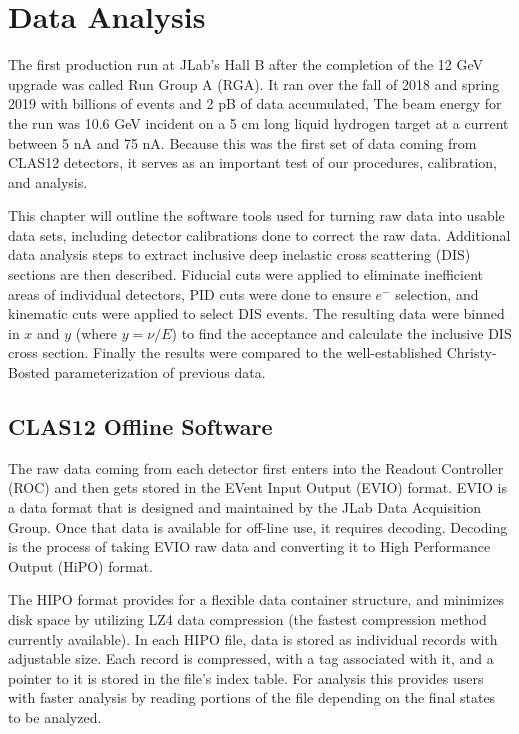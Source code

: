 \chapter{Data Analysis}
\label{ch:analysis}
The first production run at JLab's Hall B after the completion of the 12 GeV upgrade was called Run Group A (RGA). It ran over the fall of 2018 and spring 2019 with billions of events and 2 pB of data accumulated,\cite{clas12:CLARA} The beam energy for the run was 10.6 GeV incident on a 5 cm long liquid hydrogen target at a current between 5 nA and 75 nA. Because this was the first set of data coming from CLAS12 detectors, it serves as an important test of our procedures, calibration, and analysis.

This chapter will outline the software tools used for turning raw data into usable data sets, including detector calibrations done to correct the raw data. Additional data analysis steps to extract inclusive deep inelastic cross scattering (DIS) sections are then described. Fiducial cuts were applied to eliminate inefficient areas of individual detectors, PID cuts were done to ensure $e^-$ selection, and kinematic cuts were applied to select DIS events. The resulting data were binned in $x$ and $y$ (where $y=\nu/E$) to find the acceptance and calculate the inclusive DIS cross section. Finally the results were compared to the well-established Christy-Bosted parameterization of previous data.\cite{christy_bosted}

\section{CLAS12 Offline Software}
The raw data coming from each detector first enters into the Readout Controller (ROC) \cite{clas12:data} and then gets stored in the EVent Input Output (EVIO) format. EVIO is a data format that is designed and maintained by the JLab Data Acquisition Group. Once that data is available for off-line use, it requires decoding. Decoding is the process of taking EVIO raw data and converting it to High Performance Output (HiPO) format. 

The HIPO format provides for a flexible data container structure, and minimizes disk space by utilizing LZ4 data compression (the fastest compression method currently available). In each HIPO file, data is stored as individual records with adjustable size. Each record is compressed, with a tag associated with it, and a pointer to it is stored in the file's index table. For analysis this provides users with faster analysis by reading portions of the file depending on the final states to be analyzed.

